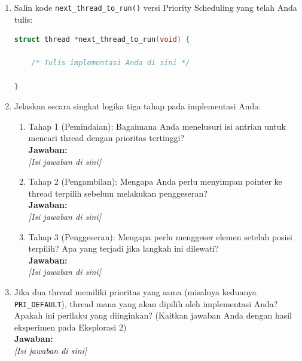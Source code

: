 \begin{enumerate}

	\item Salin kode \texttt{next\_thread\_to\_run()} versi Priority Scheduling yang telah Anda tulis:

	      \begin{lstlisting}[language=C, caption={Implementasi \texttt{next\_thread\_to\_run()} versi Priority oleh mahasiswa}]
struct thread *next_thread_to_run(void) {

    /* Tulis implementasi Anda di sini */

}
    \end{lstlisting}

	\item Jelaskan secara singkat logika tiga tahap pada implementasi Anda:
	      \begin{enumerate}
		      \item[(a)] Tahap 1 (Pemindaian): Bagaimana Anda menelusuri isi antrian untuk mencari thread dengan prioritas tertinggi?\\[0.2cm]
		            \textbf{Jawaban:}\\
		            \textit{[Isi jawaban di sini]}

		      \item[(b)] Tahap 2 (Pengambilan): Mengapa Anda perlu menyimpan pointer ke thread terpilih sebelum melakukan penggeseran?\\[0.2cm]
		            \textbf{Jawaban:}\\
		            \textit{[Isi jawaban di sini]}

		      \item[(c)] Tahap 3 (Penggeseran): Mengapa perlu menggeser elemen setelah posisi terpilih? Apa yang terjadi jika langkah ini dilewati?\\[0.2cm]
		            \textbf{Jawaban:}\\
		            \textit{[Isi jawaban di sini]}
	      \end{enumerate}

	\item Jika dua thread memiliki prioritas yang sama (misalnya keduanya \texttt{PRI\_DEFAULT}), thread mana yang akan dipilih oleh implementasi Anda? Apakah ini perilaku yang diinginkan? (Kaitkan jawaban Anda dengan hasil eksperimen pada Eksplorasi 2)\\[0.2cm]
	      \textbf{Jawaban:}\\
	      \textit{[Isi jawaban di sini]}

\end{enumerate}


